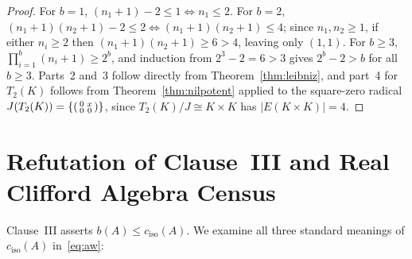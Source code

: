 \documentclass[11pt,a4paper]{article}
\theoremstyle{definition}
\newenvironment{psmallmatrix}{\left(\begin{smallmatrix}}{\end{smallmatrix}\right)}
\begin{document}
\begin{proof}
For $b=1$, $(n_1+1)-2\le 1 \iff n_1\le 2$. For $b=2$, $(n_1+1)(n_2+1)-2\le 2 \iff (n_1+1)(n_2+1)\le 4$;
since $n_1,n_2\ge 1$, if either $n_i\ge 2$ then $(n_1+1)(n_2+1)\ge 6 > 4$, leaving only
$(1,1)$. For $b\ge 3$, $\prod_{i=1}^b(n_i+1) \ge 2^b$, and induction from $2^3-2=6>3$ gives
$2^b - 2 > b$ for all $b\ge 3$. Parts~2 and~3 follow directly from Theorem~\ref{thm:leibniz},
and part~4 for $T_2(K)$ follows from Theorem~\ref{thm:nilpotent} applied to the square-zero
radical $J(T_2(K))=\{\begin{psmallmatrix}0&x\\ 0&0\end{psmallmatrix}\}$, since
$T_2(K)/J\cong K\times K$ has $|E(K\times K)|=4$.
\end{proof}

\section{Refutation of Clause~III and Real Clifford Algebra Census}

Clause~III asserts $b(A)\le c_{\mathrm{iso}}(A)$. We examine all three standard meanings of
$c_{\mathrm{iso}}(A)$ in~\eqref{eq:aw}:
\end{document}
